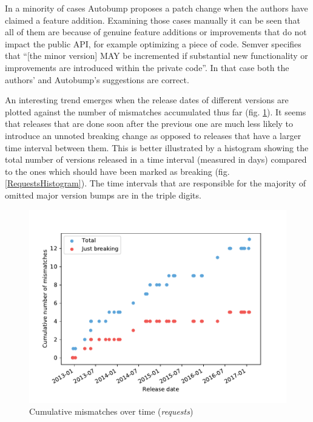 \documentclass{l4proj}
\begin{document}
In a minority of cases Autobump proposes a patch change when the
authors have claimed a feature addition. Examining those cases
manually it can be seen that all of them are because of genuine
feature additions or improvements that do not impact the public API,
for example optimizing a piece of code. Semver specifies that ``[the
minor version] MAY be incremented if substantial new functionality or
improvements are introduced within the private code''. In that case
both the authors' and Autobump's suggestions are correct.

An interesting trend emerges when the release dates of different
versions are plotted against the number of mismatches accumulated thus
far (fig. \ref{RequestsCumulativeMismatches}). It seems that releases
that are done soon after the previous one are much less likely to
introduce an unnoted breaking change as opposed to releases that have
a larger time interval between them. This is better illustrated by a
histogram showing the total number of versions released in a time
interval (measured in days) compared to the ones which should have
been marked as breaking (fig. \ref{RequestsHistogram}). The time
intervals that are responsible for the majority of omitted major
version bumps are in the triple digits.

\begin{figure}[]
\centering
\includegraphics[height=0.4\textheight]{images/evaluation/requests_cumulative_mismatches}
\caption{Cumulative mismatches over time (\textit{requests})}
\label{RequestsCumulativeMismatches}
\end{figure}
\end{document}
